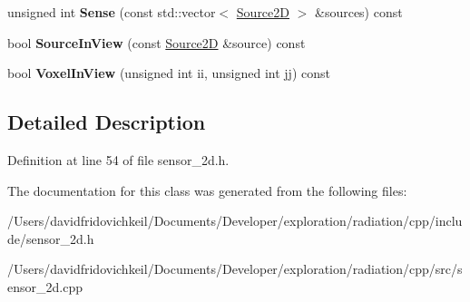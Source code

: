 \begin{DoxyCompactItemize}
\item 
\hypertarget{classradiation_1_1_sensor2_d_ad2563f06cd9c79d0ae457108cf83fd50}{}\label{classradiation_1_1_sensor2_d_ad2563f06cd9c79d0ae457108cf83fd50} 
unsigned int {\bfseries Sense} (const std\+::vector$<$ \hyperlink{classradiation_1_1_source2_d}{Source2D} $>$ \&sources) const
\item 
\hypertarget{classradiation_1_1_sensor2_d_a46ad43f9aa3cdc9d87ec73a441964031}{}\label{classradiation_1_1_sensor2_d_a46ad43f9aa3cdc9d87ec73a441964031} 
bool {\bfseries Source\+In\+View} (const \hyperlink{classradiation_1_1_source2_d}{Source2D} \&source) const
\item 
\hypertarget{classradiation_1_1_sensor2_d_a981204a964dad786d1585543de78c4eb}{}\label{classradiation_1_1_sensor2_d_a981204a964dad786d1585543de78c4eb} 
bool {\bfseries Voxel\+In\+View} (unsigned int ii, unsigned int jj) const
\end{DoxyCompactItemize}


\subsection{Detailed Description}


Definition at line 54 of file sensor\+\_\+2d.\+h.



The documentation for this class was generated from the following files\+:\begin{DoxyCompactItemize}
\item 
/\+Users/davidfridovichkeil/\+Documents/\+Developer/exploration/radiation/cpp/include/sensor\+\_\+2d.\+h\item 
/\+Users/davidfridovichkeil/\+Documents/\+Developer/exploration/radiation/cpp/src/sensor\+\_\+2d.\+cpp\end{DoxyCompactItemize}

